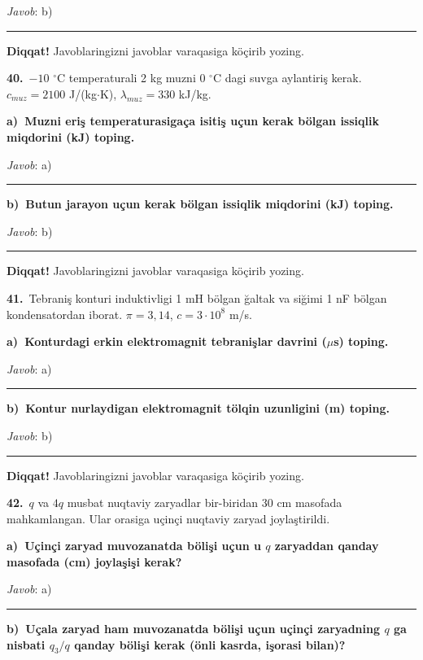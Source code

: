 \documentclass[11pt,a4paper]{article}
\newcommand{\blank}{\rule{5cm}{0.4pt}}
\begin{document}
\noindent\textit{Javob}: b)\ \blank\par
\medskip\noindent\textbf{Diqqat!} Javoblaringizni javoblar varaqasiga köçirib yozing.\par\vspace{10pt}
\noindent\textbf{40.}\ $-10$ $^\circ$C temperaturali 2 kg muzni 0 $^\circ$C dagi suvga aylantiriş kerak. $c_{muz}=2100$ J/(kg$\cdot$K), $\lambda_{muz}=330$ kJ/kg.\par\smallskip
\medskip\noindent\textbf{a)\ Muzni eriş temperaturasigaça isitiş uçun kerak bölgan issiqlik miqdorini (kJ) toping.}\par
\noindent\textit{Javob}: a)\ \blank\par
\medskip\noindent\textbf{b)\ Butun jarayon uçun kerak bölgan issiqlik miqdorini (kJ) toping.}\par
\noindent\textit{Javob}: b)\ \blank\par
\medskip\noindent\textbf{Diqqat!} Javoblaringizni javoblar varaqasiga köçirib yozing.\par\vspace{10pt}
\noindent\textbf{41.}\ Tebraniş konturi induktivligi 1 mH bölgan ğaltak va siğimi 1 nF bölgan kondensatordan iborat. $\pi=3{,}14$, $c=3\cdot10^8$ m/s.\par\smallskip
\medskip\noindent\textbf{a)\ Konturdagi erkin elektromagnit tebranişlar davrini ($\mu$s) toping.}\par
\noindent\textit{Javob}: a)\ \blank\par
\medskip\noindent\textbf{b)\ Kontur nurlaydigan elektromagnit tölqin uzunligini (m) toping.}\par
\noindent\textit{Javob}: b)\ \blank\par
\medskip\noindent\textbf{Diqqat!} Javoblaringizni javoblar varaqasiga köçirib yozing.\par\vspace{10pt}
\noindent\textbf{42.}\ $q$ va $4q$ musbat nuqtaviy zaryadlar bir-biridan 30 cm masofada mahkamlangan. Ular orasiga uçinçi nuqtaviy zaryad joylaştirildi.\par\smallskip
\medskip\noindent\textbf{a)\ Uçinçi zaryad muvozanatda bölişi uçun u $q$ zaryaddan qanday masofada (cm) joylaşişi kerak?}\par
\noindent\textit{Javob}: a)\ \blank\par
\medskip\noindent\textbf{b)\ Uçala zaryad ham muvozanatda bölişi uçun uçinçi zaryadning $q$ ga nisbati $q_3/q$ qanday bölişi kerak (önli kasrda, işorasi bilan)?}\par
\end{document}
